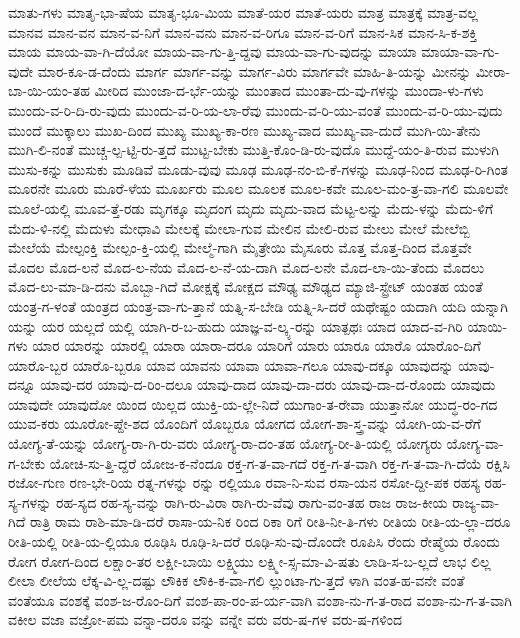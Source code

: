 {ಮಾತು-ಗಳು
ಮಾತೃ-ಭಾ-ಷೆಯ
ಮಾತೃ-ಭೂ-ಮಿಯ
ಮಾತೆ-ಯರ
ಮಾತೆ-ಯರು
ಮಾತ್ರ
ಮಾತ್ರಕ್ಕೆ
ಮಾತ್ರ-ವಲ್ಲ
ಮಾನವ
ಮಾನ-ವನ
ಮಾನ-ವ-ನಿಗೆ
ಮಾನ-ವನು
ಮಾನ-ವ-ರಿಗೂ
ಮಾನ-ವ-ರಿಗೆ
ಮಾನ-ಸಿಕ
ಮಾನ-ಸಿ-ಕ-ಶಕ್ತಿ
ಮಾಯ
ಮಾಯ-ವಾ-ಗಿ-ದೆಯೋ
ಮಾಯ-ವಾ-ಗು-ತ್ತಿ-ದ್ದವು
ಮಾಯ-ವಾ-ಗು-ವುದನ್ನು
ಮಾಯಾ
ಮಾಯಾ-ವಾ-ಗು-ವುದೇ
ಮಾರ-ಕೂ-ಡ-ದೆಂದು
ಮಾರ್ಗ
ಮಾರ್ಗ-ವನ್ನು
ಮಾರ್ಗ-ವಿರು
ಮಾರ್ಗವೇ
ಮಾಹಿ-ತಿ-ಯನ್ನು
ಮೀನನ್ನು
ಮೀರಾ-ಬಾ-ಯಿ-ಯಂ-ತಹ
ಮೀರಿದ
ಮುಂಜಾ-ದ-ರ್ಭೆ-ಯನ್ನು
ಮುಂತಾದ
ಮುಂತಾ-ದು-ವು-ಗಳನ್ನು
ಮುಂದಾ-ಳು-ಗಳು
ಮುಂದು-ವ-ರಿ-ದಿ-ರು-ವುದು
ಮುಂದು-ವ-ರಿ-ಯ-ಲಾ-ರೆವು
ಮುಂದು-ವ-ರಿ-ಯು-ವಂತೆ
ಮುಂದು-ವ-ರಿ-ಯು-ವುದು
ಮುಂದೆ
ಮುಕ್ಕಾಲು
ಮುಖ-ದಿಂದ
ಮುಖ್ಯ
ಮುಖ್ಯ-ಕಾ-ರಣ
ಮುಖ್ಯ-ವಾದ
ಮುಖ್ಯ-ವಾ-ದುದೆ
ಮುಗಿ-ಯಿ-ತೇನು
ಮುಗಿ-ಲಿ-ನಂತೆ
ಮುಚ್ಚ-ಲ್ಪ-ಟ್ಟಿ-ರು-ತ್ತದೆ
ಮುಟ್ಟ-ಬೇಕು
ಮುತ್ತಿ-ಕೊಂ-ಡಿ-ರು-ವುದೊ
ಮುದ್ದೆ-ಯಂ-ತಿ-ರುವ
ಮುಳುಗಿ
ಮುಸು-ಕನ್ನು
ಮುಸುಕು
ಮೂಡಿವೆ
ಮೂಡು-ವುವು
ಮೂಢ
ಮೂಢ-ನಂ-ಬಿ-ಕೆ-ಗಳನ್ನು
ಮೂಢ-ನಿಂದ
ಮೂಢ-ರಿ-ಗಿಂತ
ಮೂರನೇ
ಮೂರು
ಮೂರೆ-ಳೆಯ
ಮೂರ್ಖರು
ಮೂಲ
ಮೂಲಕ
ಮೂಲ-ಕವೇ
ಮೂಲ-ಮಂ-ತ್ರ-ವಾ-ಗಲಿ
ಮೂಲವೇ
ಮೂಲೆ-ಯಲ್ಲಿ
ಮೂವ-ತ್ತೆ-ರಡು
ಮೃಗಕ್ಕೂ
ಮೃದಂಗ
ಮೃದು
ಮೃದು-ವಾದ
ಮೆಟ್ಟ-ಲನ್ನು
ಮೆದು-ಳನ್ನು
ಮೆದು-ಳಿಗೆ
ಮೆದು-ಳಿ-ನಲ್ಲಿ
ಮೆದುಳು
ಮೇಧಾವಿ
ಮೇಲಕ್ಕೆ
ಮೇಲಾ-ಗುವ
ಮೇಲಿನ
ಮೇಲಿ-ರುವ
ಮೇಲು
ಮೇಲೆ
ಮೇಲೆಬ್ಬಿ
ಮೇಲೆಯೆ
ಮೇಲ್ಪಂಕ್ತಿ
ಮೇಲ್ಪಂ-ಕ್ತಿ-ಯಲ್ಲಿ
ಮೇಲ್ಮೆ-ಗಾಗಿ
ಮೈತ್ರೇಯಿ
ಮೈಸೂರು
ಮೊತ್ತ
ಮೊತ್ತ-ದಿಂದ
ಮೊತ್ತವೇ
ಮೊದಲ
ಮೊದ-ಲನೆ
ಮೊದ-ಲ-ನೆಯ
ಮೊದ-ಲ-ನೆ-ಯ-ದಾಗಿ
ಮೊದ-ಲನೇ
ಮೊದ-ಲಾ-ಯಿ-ತೆಂದು
ಮೊದಲು
ಮೊದ-ಲು-ಮಾ-ಡಿ-ದನು
ಮೊಬ್ಬಾ-ಗಿದೆ
ಮೋಕ್ಷಕ್ಕೆ
ಮೋಕ್ಷದ
ಮೌಢ್ಯ
ಮೌಢ್ಯದ
ಮ್ಯಾಜಿ-ಸ್ಟ್ರೇಟ್
ಯಂತಹ
ಯಂತೆ
ಯಂತ್ರ-ಗ-ಳಂತೆ
ಯಂತ್ರದ
ಯಂತ್ರ-ವಾ-ಗು-ತ್ತಾನೆ
ಯತ್ನಿ-ಸ-ಬೇಡಿ
ಯತ್ನಿ-ಸಿ-ದರೆ
ಯಥೇಷ್ಟಂ
ಯದಾಗಿ
ಯದಿ
ಯನ್ನಾಗಿ
ಯನ್ನು
ಯರ
ಯಲ್ಲದೆ
ಯಲ್ಲಿ
ಯಾಗಿ-ರ-ಬ-ಹುದು
ಯಾಜ್ಞ-ವ-ಲ್ಕ್ಯ-ರನ್ನು
ಯಾತ್ಪಥಃ
ಯಾದ
ಯಾದ-ವ-ಗಿರಿ
ಯಾಯಿ-ಗಳು
ಯಾರ
ಯಾರನ್ನು
ಯಾರಲ್ಲಿ
ಯಾರಾ
ಯಾರಾ-ದರೂ
ಯಾರಿಗೆ
ಯಾರು
ಯಾರೂ
ಯಾರೊ
ಯಾರೊಂ-ದಿಗೆ
ಯಾರೊ-ಬ್ಬರ
ಯಾರೊ-ಬ್ಬರೂ
ಯಾವ
ಯಾವನು
ಯಾವಾ
ಯಾವಾ-ಗಲೂ
ಯಾವು-ದಕ್ಕೂ
ಯಾವುದನ್ನು
ಯಾವು-ದನ್ನೂ
ಯಾವು-ದರ
ಯಾವು-ದ-ರಿಂ-ದಲೂ
ಯಾವು-ದಾದ
ಯಾವು-ದಾ-ದರು
ಯಾವು-ದಾ-ದ-ರೊಂದು
ಯಾವುದು
ಯಾವುದೇ
ಯಾವುದೋ
ಯಿಂದ
ಯಿಲ್ಲದ
ಯುಕ್ತಿ-ಯ-ಲ್ಲೇ-ನಿದೆ
ಯುಗಾಂ-ತ-ರೇವಾ
ಯುತ್ತಾನೋ
ಯುದ್ಧ-ರಂ-ಗದ
ಯುವ-ಕರು
ಯೂರೋ-ಪ್ದೇ-ಶದ
ಯೊಂದಿಗೆ
ಯೊಬ್ಬರೂ
ಯೋಗದ
ಯೋಗ-ಶಾ-ಸ್ತ್ರ-ವನ್ನು
ಯೋಗಿ-ಯ-ವ-ರೆಗೆ
ಯೋಗ್ಯ-ತೆ-ಯನ್ನು
ಯೋಗ್ಯ-ರಾ-ಗಿ-ರು-ವರು
ಯೋಗ್ಯ-ರಾ-ದಂ-ತಹ
ಯೋಗ್ಯ-ರೀ-ತಿ-ಯಲ್ಲಿ
ಯೋಗ್ಯರು
ಯೋಗ್ಯ-ವಾ-ಗ-ಬೇಕು
ಯೋಚಿ-ಸು-ತ್ತಿ-ದ್ದರೆ
ಯೋಜ-ಕ-ನೆಂದೂ
ರಕ್ತ-ಗ-ತ-ವಾ-ಗದೆ
ರಕ್ತ-ಗ-ತ-ವಾಗಿ
ರಕ್ತ-ಗ-ತ-ವಾ-ಗಿ-ದೆಯೆ
ರಕ್ಷಿಸಿ
ರಜೋ-ಗುಣ
ರಣ-ಭೇ-ರಿಯ
ರತ್ನ-ಗಳನ್ನು
ರನ್ನು
ರಲ್ಲಿಯೂ
ರವಾ-ನಿ-ಸುವ
ರಸಾ-ಯನ
ರಸೋ-ದ್ದೀ-ಪಕ
ರಹಸ್ಯ
ರಹ-ಸ್ಯ-ಗಳನ್ನು
ರಹ-ಸ್ಯದ
ರಹ-ಸ್ಯ-ವನ್ನು
ರಾಗಿ-ರು-ವಿರಾ
ರಾಗಿ-ರು-ವೆವು
ರಾಗು-ವಂ-ತಹ
ರಾಜ
ರಾಜ-ಕೀಯ
ರಾಜ್ಯ-ವಾ-ಗಿದೆ
ರಾತ್ರಿ
ರಾಮ
ರಾಶಿ-ಮಾ-ಡಿ-ದರೆ
ರಾಸಾ-ಯ-ನಿಕ
ರಿಂದ
ರಿಕಾ
ರಿಗೆ
ರೀತಿ-ನೀ-ತಿ-ಗಳು
ರೀತಿಯ
ರೀತಿ-ಯ-ಲ್ಲಾ-ದರೂ
ರೀತಿ-ಯಲ್ಲಿ
ರೀತಿ-ಯ-ಲ್ಲಿಯೂ
ರೂಢಿಸಿ
ರೂಢಿ-ಸಿ-ದರೆ
ರೂಢಿ-ಸು-ವು-ದೊಂದೇ
ರೂಪಿಸಿ
ರೆಂದು
ರೇಷ್ಮೆಯ
ರೊಂದು
ರೋಗ
ರೋಗ-ದಿಂದ
ಲಕ್ಷಾಂ-ತರ
ಲಕ್ಷೀ-ಬಾಯಿ
ಲಕ್ಷ್ಮಿಯು
ಲಕ್ಷ್ಮೀ-ಸ್ಸ-ಮಾ-ವಿ-ಷತು
ಲಾಡಿ-ಸ-ಬ-ಲ್ಲದೆ
ಲಾಭ
ಲಿಲ್ಲ
ಲೀಲಾ
ಲೀಲೆಯ
ಲೆಕ್ಕ-ವಿ-ಲ್ಲ-ದಷ್ಟು
ಲೌಕಿಕ
ಲೌಕಿ-ಕ-ವಾ-ಗಲಿ
ಲ್ಲುಂಟಾ-ಗು-ತ್ತದೆ
ಳಾಗಿ
ವಂತ-ಹ-ವನೇ
ವಂತೆ
ವಂತೆಯೂ
ವಂಶಕ್ಕೆ
ವಂಶ-ಜ-ರೊಂ-ದಿಗೆ
ವಂಶ-ಪಾ-ರಂ-ಪ-ರ್ಯ-ವಾಗಿ
ವಂಶಾ-ನು-ಗ-ತ-ರಾದ
ವಂಶಾ-ನು-ಗ-ತ-ವಾಗಿ
ವಕೀಲ
ವಜಾ
ವಜ್ರೋ-ಪಮ
ವನ್ನಾ-ದರೂ
ವನ್ನು
ವನ್ನೇ
ವರು
ವರು-ಷ-ಗಳ
ವರು-ಷ-ಗಳಿಂದ
}
